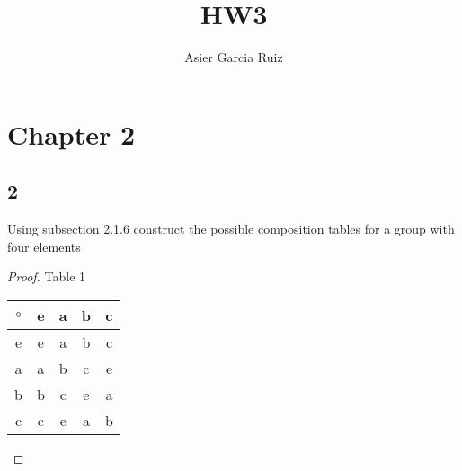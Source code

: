 \documentclass{article}
\title{HW3}
\author{Asier Garcia Ruiz}
\begin{document}
\maketitle

\section*{Chapter 2}
\subsection*{2}
Using subsection 2.1.6 construct the possible composition tables for a group with
four elements

\begin{proof}
    Table 1
    \begin{center}
        \begin{tabular}{ c | c c c c}
            $\circ$ & e & a & b & c \\
            \hline
            e       & e & a & b & c \\
            a       & a & b & c & e \\
            b       & b & c & e & a \\
            c       & c & e & a & b
        \end{tabular}
    \end{center}


\end{proof}
\end{document}
